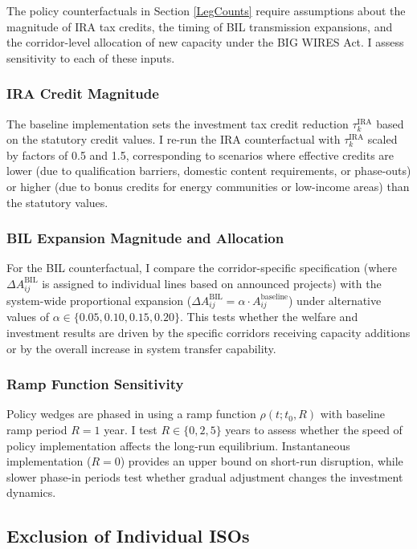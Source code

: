 \documentclass[12pt]{article}
\begin{document}
The policy counterfactuals in Section \ref{LegCounts} require assumptions about the magnitude of IRA tax credits, the timing of BIL transmission expansions, and the corridor-level allocation of new capacity under the BIG WIRES Act. I assess sensitivity to each of these inputs.

\subsubsection{IRA Credit Magnitude}

The baseline implementation sets the investment tax credit reduction $\tau^{\text{IRA}}_k$ based on the statutory credit values. I re-run the IRA counterfactual with $\tau^{\text{IRA}}_k$ scaled by factors of 0.5 and 1.5, corresponding to scenarios where effective credits are lower (due to qualification barriers, domestic content requirements, or phase-outs) or higher (due to bonus credits for energy communities or low-income areas) than the statutory values.

\subsubsection{BIL Expansion Magnitude and Allocation}

For the BIL counterfactual, I compare the corridor-specific specification (where $\Delta A^{\text{BIL}}_{ij}$ is assigned to individual lines based on announced projects) with the system-wide proportional expansion ($\Delta A^{\text{BIL}}_{ij} = \alpha \cdot A^{\text{baseline}}_{ij}$) under alternative values of $\alpha \in \{0.05, 0.10, 0.15, 0.20\}$. This tests whether the welfare and investment results are driven by the specific corridors receiving capacity additions or by the overall increase in system transfer capability.

\subsubsection{Ramp Function Sensitivity}

Policy wedges are phased in using a ramp function $\rho(t; t_0, R)$ with baseline ramp period $R = 1$ year. I test $R \in \{0, 2, 5\}$ years to assess whether the speed of policy implementation affects the long-run equilibrium. Instantaneous implementation ($R = 0$) provides an upper bound on short-run disruption, while slower phase-in periods test whether gradual adjustment changes the investment dynamics.


\subsection{Exclusion of Individual ISOs}\label{app:robustness:iso}
\end{document}
